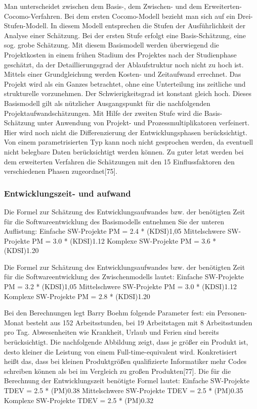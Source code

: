Man unterscheidet zwischen dem Basis-, dem Zwischen- und dem Erweiterten-Cocomo-Verfahren. Bei dem ersten Cocomo-Modell bezieht man sich auf ein Drei-Stufen-Modell. In diesem Modell entsprechen die Stufen der Ausführlichkeit der Analyse einer Schätzung. Bei der ersten Stufe erfolgt eine Basis-Schätzung, eine sog. grobe Schätzung. Mit diesem Basismodell werden überwiegend die Projektkosten in einem frühen Stadium des Projektes nach der Studienphase geschätzt, da der Detaillierungsgrad der Ablaufstruktur noch nicht zu hoch ist. Mittels einer Grundgleichung werden Kosten- und Zeitaufwand errechnet. Das Projekt wird als ein Ganzes betrachtet, ohne eine Unterteilung ins zeitliche und strukturelle vorzunehmen. Der Schwierigkeitsgrad ist konstant gleich hoch. Dieses Basismodell gilt als nützlicher Ausgangspunkt für die nachfolgenden Projektaufwandschätzungen.
Mit Hilfe der zweiten Stufe wird die Basis-Schätzung unter Anwendung von Projekt- und Prozessmultiplikatoren verfeinert. Hier wird noch nicht die Differenzierung der Entwicklungsphasen berücksichtigt. Von einem parametrisierten Typ kann noch nicht gesprochen werden, da eventuell nicht belegbare Daten berücksichtigt werden können. Zu guter letzt werden bei dem erweiterten Verfahren die Schätzungen mit den 15 Einflussfaktoren den verschiedenen Phasen zugeordnet[75].

\subsubsection{Entwicklungszeit- und aufwand}

Die Formel zur Schätzung des Entwicklungsaufwandes bzw. der benötigten Zeit für die Softwareentwicklung des Basismodells entnehmen Sie der unteren Auflistung:
Einfache SW-Projekte	PM = 2.4 * (KDSI)1,05
Mittelschwere SW-Projekte   	PM = 3.0 * (KDSI)1.12
Komplexe SW-Projekte	PM = 3.6 * (KDSI)1.20

Die Formel zur Schätzung des Entwicklungsaufwandes bzw. der benötigten Zeit für die Softwareentwicklung des Zwischenmodells lautet:
Einfache SW-Projekte	PM = 3.2 * (KDSI)1,05
Mittelschwere SW-Projekte   	PM = 3.0 * (KDSI)1.12
Komplexe SW-Projekte	PM = 2.8 * (KDSI)1.20

Bei den Berechnungen legt Barry Boehm folgende Parameter fest: ein Personen-Monat besteht aus 152 Arbeitsstunden, bei 19 Arbeitstagen mit 8 Arbeitsstunden pro Tag. Abwesenheiten wie Krankheit, Urlaub und Ferien sind bereits berücksichtigt.
Die nachfolgende Abbildung zeigt, dass je größer ein Produkt ist, desto kleiner die Leistung von einem Full-time-equivalent wird. Konkretisiert heißt das, dass bei kleinen Produktgrößen qualifizierte Informatiker mehr Codes schreiben können als bei im Vergleich zu großen Produkten[77].
Die für die Berechnung der Entwicklungszeit benötigte Formel lautet:
Einfache SW-Projekte	TDEV = 2.5 * (PM)0.38
Mittelschwere SW-Projekte   	TDEV = 2.5 * (PM)0.35
Komplexe SW-Projekte	TDEV = 2.5 * (PM)0.32

